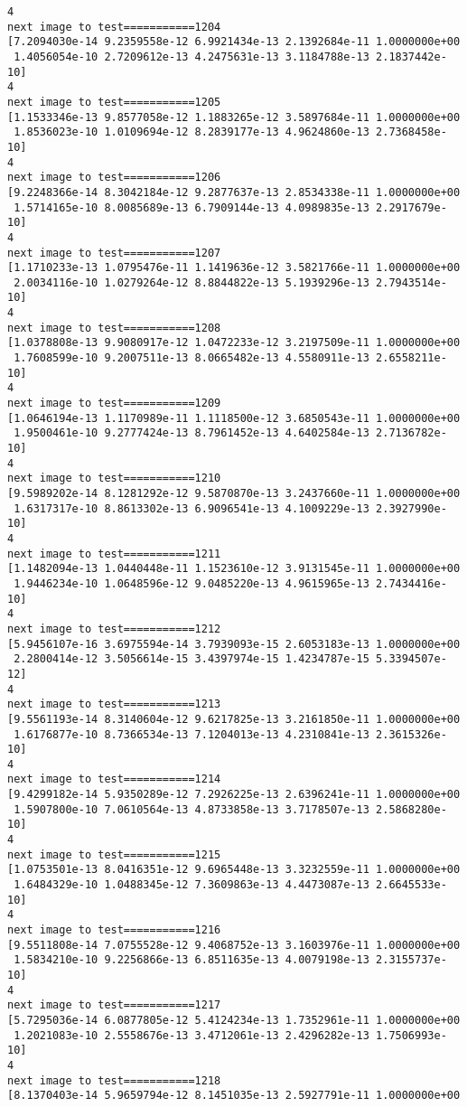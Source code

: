 \documentclass[11pt]{article}
\begin{document}
\begin{Verbatim}[commandchars=\\\{\}]
4
next image to test===========1204
[7.2094030e-14 9.2359558e-12 6.9921434e-13 2.1392684e-11 1.0000000e+00
 1.4056054e-10 2.7209612e-13 4.2475631e-13 3.1184788e-13 2.1837442e-10]
4
next image to test===========1205
[1.1533346e-13 9.8577058e-12 1.1883265e-12 3.5897684e-11 1.0000000e+00
 1.8536023e-10 1.0109694e-12 8.2839177e-13 4.9624860e-13 2.7368458e-10]
4
next image to test===========1206
[9.2248366e-14 8.3042184e-12 9.2877637e-13 2.8534338e-11 1.0000000e+00
 1.5714165e-10 8.0085689e-13 6.7909144e-13 4.0989835e-13 2.2917679e-10]
4
next image to test===========1207
[1.1710233e-13 1.0795476e-11 1.1419636e-12 3.5821766e-11 1.0000000e+00
 2.0034116e-10 1.0279264e-12 8.8844822e-13 5.1939296e-13 2.7943514e-10]
4
next image to test===========1208
[1.0378808e-13 9.9080917e-12 1.0472233e-12 3.2197509e-11 1.0000000e+00
 1.7608599e-10 9.2007511e-13 8.0665482e-13 4.5580911e-13 2.6558211e-10]
4
next image to test===========1209
[1.0646194e-13 1.1170989e-11 1.1118500e-12 3.6850543e-11 1.0000000e+00
 1.9500461e-10 9.2777424e-13 8.7961452e-13 4.6402584e-13 2.7136782e-10]
4
next image to test===========1210
[9.5989202e-14 8.1281292e-12 9.5870870e-13 3.2437660e-11 1.0000000e+00
 1.6317317e-10 8.8613302e-13 6.9096541e-13 4.1009229e-13 2.3927990e-10]
4
next image to test===========1211
[1.1482094e-13 1.0440448e-11 1.1523610e-12 3.9131545e-11 1.0000000e+00
 1.9446234e-10 1.0648596e-12 9.0485220e-13 4.9615965e-13 2.7434416e-10]
4
next image to test===========1212
[5.9456107e-16 3.6975594e-14 3.7939093e-15 2.6053183e-13 1.0000000e+00
 2.2800414e-12 3.5056614e-15 3.4397974e-15 1.4234787e-15 5.3394507e-12]
4
next image to test===========1213
[9.5561193e-14 8.3140604e-12 9.6217825e-13 3.2161850e-11 1.0000000e+00
 1.6176877e-10 8.7366534e-13 7.1204013e-13 4.2310841e-13 2.3615326e-10]
4
next image to test===========1214
[9.4299182e-14 5.9350289e-12 7.2926225e-13 2.6396241e-11 1.0000000e+00
 1.5907800e-10 7.0610564e-13 4.8733858e-13 3.7178507e-13 2.5868280e-10]
4
next image to test===========1215
[1.0753501e-13 8.0416351e-12 9.6965448e-13 3.3232559e-11 1.0000000e+00
 1.6484329e-10 1.0488345e-12 7.3609863e-13 4.4473087e-13 2.6645533e-10]
4
next image to test===========1216
[9.5511808e-14 7.0755528e-12 9.4068752e-13 3.1603976e-11 1.0000000e+00
 1.5834210e-10 9.2256866e-13 6.8511635e-13 4.0079198e-13 2.3155737e-10]
4
next image to test===========1217
[5.7295036e-14 6.0877805e-12 5.4124234e-13 1.7352961e-11 1.0000000e+00
 1.2021083e-10 2.5558676e-13 3.4712061e-13 2.4296282e-13 1.7506993e-10]
4
next image to test===========1218
[8.1370403e-14 5.9659794e-12 8.1451035e-13 2.5927791e-11 1.0000000e+00

\end{Verbatim}
\end{document}
